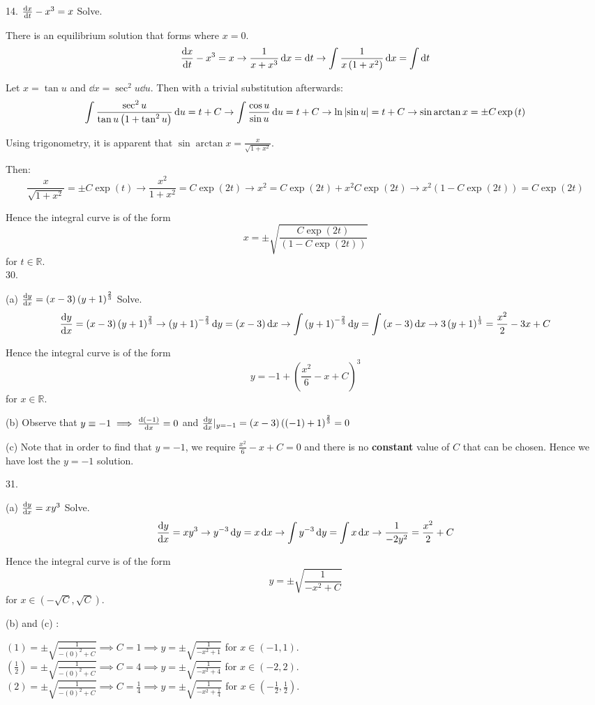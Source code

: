 \documentclass[11pt]{article}
\newcommand{\br}[1]{\left(#1\right)}
\begin{document}
14. $\dv{x}{t} - x^3 = x$ Solve.

There is an equilibrium solution that forms where $x=0$.
$$\dv{x}{t} - x^3 = x \to \frac{1}{x+x^3}\dd{x} = \dd{t} \to \int \frac{1}{x\br{1+x^2}}\dd{x} = \int \dd{t}$$

Let $x=\tan{u}$ and $\dd{x} = \sec^2{u}\dd{u}$. Then with a trivial substitution afterwards:
$$\int \frac{\sec^2{u}}{\tan{u}\br{1+\tan^2{u}}}\dd{u} = t + C \to \int \frac{\cos{u}}{\sin{u}}\dd{u} = t + C \to \ln\abs{\sin{u}} = t + C \to \sin{\arctan{x}} = \pm C\exp\br{t}$$

Using trigonometry, it is apparent that $\sin{\arctan{x}} = \frac{x}{\sqrt{1+x^2}}$.

Then:
$$\frac{x}{\sqrt{1+x^2}} = \pm C\exp\br{t} \to \frac{x^2}{1+x^2} = C\exp\br{2t} \to x^2 = C\exp\br{2t} + x^2C\exp\br{2t} \to x^2\br{1-C\exp\br{2t}} = C\exp\br{2t}$$

Hence the integral curve is of the form $$x = \pm\sqrt{\frac{C\exp\br{2t}}{\br{1-C\exp\br{2t}}}}$$ for $t\in \mathbb{R}$.\\

30.

(a) $\dv{y}{x} = \br{x-3}\br{y+1}^{\frac{2}{3}}$ Solve.
$$\dv{y}{x} = \br{x-3}\br{y+1}^{\frac{2}{3}} \to \br{y+1}^{-\frac{2}{3}}\dd{y} = \br{x-3}\dd{x} \to \int \br{y+1}^{-\frac{2}{3}}\dd{y} = \int \br{x-3}\dd{x} \to 3\br{y+1}^{\frac{1}{3}} = \frac{x^2}{2} - 3x + C$$

Hence the integral curve is of the form $$y = -1 + \br{\frac{x^2}{6} - x + C}^3$$ for $x\in \mathbb{R}$.

(b) Observe that $y\equiv -1 \implies \dv{\br{-1}}{x} = 0$ and $\dv{y}{x}\rvert_{y=-1} = \br{x-3}\br{\br{-1}+1}^{\frac{2}{3}} = 0$ 

(c) Note that in order to find that $y = -1$, we require $\frac{x^2}{6} - x + C = 0$ and there is no \textbf{constant} value of $C$ that can be chosen. Hence we have lost the $y = -1$ solution.

31. 

(a) $\dv{y}{x} = xy^3$ Solve.
$$\dv{y}{x} = xy^3 \to y^{-3}\dd{y} = x\dd{x} \to \int y^{-3}\dd{y} = \int x\dd{x} \to \frac{1}{-2y^2} = \frac{x^2}{2} + C$$

Hence the integral curve is of the form $$y = \pm\sqrt{\frac{1}{-x^2 + C}}$$ for $x \in \br{-\sqrt{C},\sqrt{C}}$.

(b) and (c) :

$\br{1} = \pm\sqrt{\frac{1}{-\br{0}^2 + C}} \implies C = 1 \implies y = \pm\sqrt{\frac{1}{-x^2 + 1}}$ for $x \in \br{-1,1}$.\\
$\br{\frac{1}{2}} = \pm\sqrt{\frac{1}{-\br{0}^2 + C}} \implies C = 4 \implies y = \pm\sqrt{\frac{1}{-x^2 + 4}}$ for $x \in \br{-2,2}$.\\
$\br{2} = \pm\sqrt{\frac{1}{-\br{0}^2 + C}} \implies C = \frac{1}{4} \implies y = \pm\sqrt{\frac{1}{-x^2 + \frac{1}{4}}}$ for $x \in \br{-\frac{1}{2},\frac{1}{2}}$.\\
\end{document}
